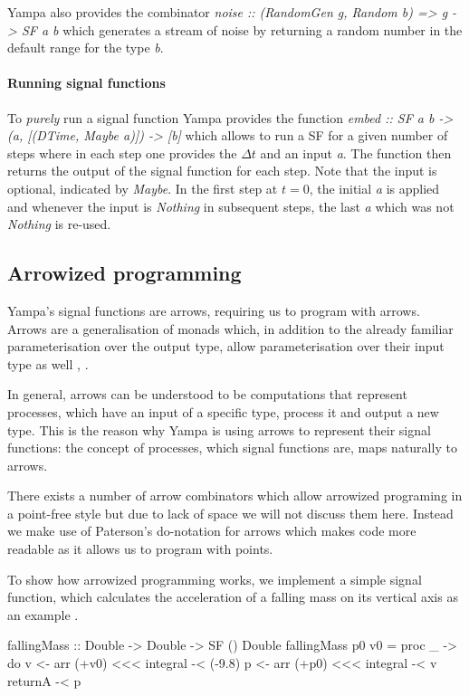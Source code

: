 Yampa also provides the combinator \textit{noise :: (RandomGen g, Random b) => g -> SF a b} which generates a stream of noise by returning a random number in the default range for the type \textit{b}.

\paragraph{Running signal functions}
To \textit{purely} run a signal function Yampa provides the function \textit{embed :: SF a b -> (a, [(DTime, Maybe a)]) -> [b]} which allows to run a SF for a given number of steps where in each step one provides the $\Delta t$ and an input \textit{a}. The function then returns the output of the signal function for each step. Note that the input is optional, indicated by \textit{Maybe}. In the first step at $t = 0$, the initial \textit{a} is applied and whenever the input is \textit{Nothing} in subsequent steps, the last \textit{a} which was not \textit{Nothing} is re-used.

\subsection{Arrowized programming}
Yampa's signal functions are arrows, requiring us to program with arrows. Arrows are a generalisation of monads which, in addition to the already familiar parameterisation over the output type, allow parameterisation over their input type as well \cite{hughes_generalising_2000}, \cite{hughes_programming_2005}.

In general, arrows can be understood to be computations that represent processes, which have an input of a specific type, process it and output a new type. This is the reason why Yampa is using arrows to represent their signal functions: the concept of processes, which signal functions are, maps naturally to arrows.

There exists a number of arrow combinators which allow arrowized programing in a point-free style but due to lack of space we will not discuss them here. Instead we make use of Paterson's do-notation for arrows \cite{paterson_new_2001} which makes code more readable as it allows us to program with points.

To show how arrowized programming works, we implement a simple signal function, which calculates the acceleration of a falling mass on its vertical axis as an example \cite{perez_testing_2017}.

\begin{HaskellCode}
fallingMass :: Double -> Double -> SF () Double
fallingMass p0 v0 = proc _ -> do
  v <- arr (+v0) <<< integral -< (-9.8)
  p <- arr (+p0) <<< integral -< v
  returnA -< p
\end{HaskellCode}

